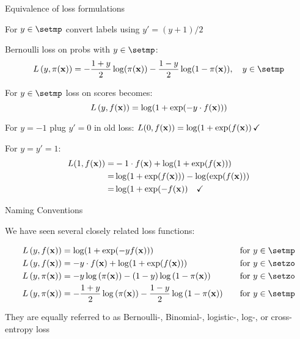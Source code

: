 \documentclass[11pt,compress,t,notes=noshow, xcolor=table]{beamer}
\begin{document}
\begin{frame2}[small]{Equivalence of loss formulations}

\begin{itemizeM}
\item For $y \in \setmp$ convert labels using $y'=(y+1)/2$ %

\item Bernoulli loss on probs with $y \in \setmp$: 
$$
\Lpixy  = - \frac{1 + y}{2} \log(\pix) - \frac{1 - y}{2} \log(1 - \pix), \quad y \in \setmp 
$$

\item For $y \in \setmp$ loss on scores becomes: 
$$
L\left(y, f(\mathbf{x})\right) = \log(1+\exp(-y \cdot f(\mathbf{x}))) 
$$
\item For $y=-1$ plug $y'=0$ in old loss: $L(0,f(\mathbf{x}))=\log(1+\exp(f(\mathbf{x})) \, \checkmark$
\item For $y=y'=1$: 
\begin{align*}
L(1,f(\mathbf{x}))=&-1 \cdot f(\mathbf{x})+\log(1+\exp(f(\mathbf{x})))\\
=&\log(1+\exp(f(\mathbf{x})))-\log(\exp(f(\mathbf{x})))\\
=&\log(1+\exp(-f(\mathbf{x})) \quad \checkmark
\end{align*}
\end{itemizeM}

\end{frame2}

\begin{vbframe}{Naming Conventions}

We have seen several closely related loss functions: 

\begin{alignat*}{3} \Lxy    &= \log(1+\exp(-y\fx)) &&\quad \text{for } y \in \setmp \\ \Lxy    &= - y \cdot \fx + \log(1 + \exp(\fx)) &&\quad \text{for } y \in \setzo \\ \Lpixy  &= - y \log \left(\pix\right) - (1 - y) \log \left(1 - \pix\right) &&\quad \text{for } y \in \setzo \\ \Lpixy  &= - \frac{1 + y}{2} \log\left(\pix\right) - \frac{1 - y}{2} \log\left(1 - \pix\right) &&\quad \text{for } y \in \setmp \end{alignat*}

\vfill

They are equally referred to as Bernoulli-, Binomial-, logistic-, log-, or cross-entropy loss

\end{vbframe}
\end{document}
